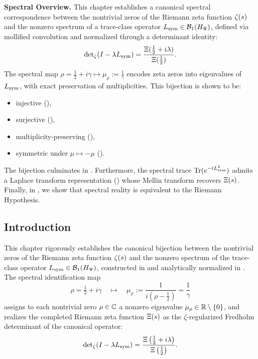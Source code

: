 \begin{previewbox}
\textbf{Spectral Overview.} This chapter establishes a canonical spectral correspondence between the nontrivial zeros of the Riemann zeta function \( \zeta(s) \) and the nonzero spectrum of a trace-class operator \( L_{\mathrm{sym}} \in \mathcal{B}_1(H_{\Psi}) \), defined via mollified convolution and normalized through a determinant identity:
\[
\det\nolimits_\zeta(I - \lambda L_{\mathrm{sym}}) = \frac{\Xi(\tfrac{1}{2} + i\lambda)}{\Xi(\tfrac{1}{2})}.
\]
The spectral map \( \rho = \tfrac{1}{2} + i\gamma \mapsto \mu_\rho := \frac{1}{\gamma} \) encodes zeta zeros into eigenvalues of \( L_{\mathrm{sym}} \), with exact preservation of multiplicities. This bijection is shown to be:
\begin{itemize}
  \item injective (),
  \item surjective (),
  \item multiplicity-preserving (),
  \item symmetric under \( \mu \mapsto -\mu \) ().
\end{itemize}
The bijection culminates in . Furthermore, the spectral trace \( \operatorname{Tr}(e^{-t L_{\mathrm{sym}}^2}) \) admits a Laplace transform representation () whose Mellin transform recovers \( \Xi(s) \). Finally, in , we show that spectral reality is equivalent to the Riemann Hypothesis.
\end{previewbox}

\subsection*{Introduction}
\label{sec:intro_spectral_correspondence}

This chapter rigorously establishes the canonical bijection between the nontrivial zeros of the Riemann zeta function \(\zeta(s)\) and the nonzero spectrum of the trace-class operator \(L_{\mathrm{sym}} \in \mathcal{B}_1(H_{\Psi})\), constructed in  and analytically normalized in . The spectral identification map
\[
\rho = \tfrac{1}{2} + i\gamma \quad \longmapsto \quad \mu_\rho := \frac{1}{i(\rho - \tfrac{1}{2})} = \frac{1}{\gamma}
\]
assigns to each nontrivial zero \(\rho \in \mathbb{C}\) a nonzero eigenvalue \(\mu_\rho \in \mathbb{R} \setminus \{0\}\), and realizes the completed Riemann zeta function \(\Xi(s)\) as the \(\zeta\)-regularized Fredholm determinant of the canonical operator:
\[
\det\nolimits_\zeta(I - \lambda L_{\mathrm{sym}}) = \frac{\Xi\left( \tfrac{1}{2} + i\lambda \right)}{\Xi\left( \tfrac{1}{2} \right)}.
\]

